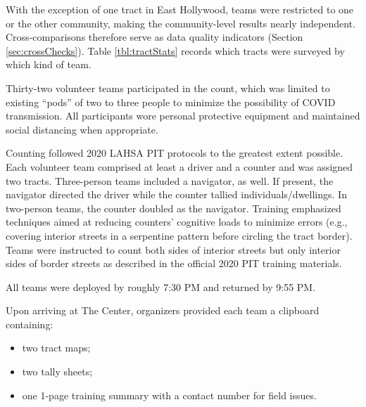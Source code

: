\documentclass[11pt,twocolumn]{article}
\def\Count{count}
\begin{document}
With 
the exception of one tract in East Hollywood, teams were restricted to one or the other community, 
making the community-level results nearly independent. Cross-comparisons therefore serve as data 
quality indicators (Section \ref{sec:crossChecks}). Table \ref{tbl:tractStats} records which tracts were 
surveyed by which kind of team. 

Thirty-two volunteer teams participated in the \Count, which was limited to existing ``pods'' of two 
to three people to minimize the possibility of COVID transmission. 
All participants wore 
personal protective equipment and maintained social distancing when appropriate.

Counting followed 2020 LAHSA PIT protocols to the greatest extent possible. Each volunteer team 
comprised at least a driver and a counter and was assigned two tracts. Three-person teams 
included a navigator, as well. If present, the navigator directed the driver while the counter tallied 
individuals/dwellings. In two-person teams, the counter doubled as the navigator. Training 
emphasized techniques aimed at reducing counters' cognitive loads to minimize errors (e.g., 
covering interior streets in a serpentine pattern before circling the tract border). Teams were 
instructed to count both sides of interior streets but only interior sides of border streets 
as described in the official 2020 PIT training materials.

All teams were deployed by roughly 7:30 PM and returned by 9:55 PM.

Upon arriving at The Center, organizers provided each team a clipboard containing:
\begin{itemize}
	\item two tract maps;
	\item two tally sheets;
	\item one 1-page training summary with a contact number for field issues.
\end{itemize}
\end{document}
